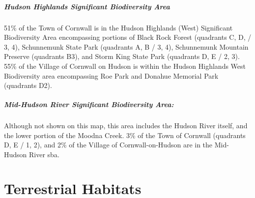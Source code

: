 \paragraph{\textit{Hudson Highlands Significant Biodiversity Area}}51\% of the 
Town of Cornwall is in the Hudson Highlands (West) Significant Biodiversity 
Area encompassing portions of Black Rock Forest (quadrants C, D, / 3, 4), 
Schunnemunk State Park (quadrants A, B / 3, 4), Schunnemunk Mountain Preserve 
(quadrants B3), and Storm King State Park (quadrants D, E / 2, 3). 55\% of the 
Village of Cornwall on Hudson is within the Hudson Highlands West Biodiversity 
area encompassing Roe Park and Donahue Memorial Park (quadrants D2). 

\paragraph{\textit{Mid-Hudson River Significant Biodiversity Area:}} Although not 
shown on this map, this area includes the Hudson River itself, and the lower 
portion of the Moodna Creek. 3\% of the Town of Cornwall (quadrants D, E / 1, 
2), and 2\% of the Village of Cornwall-on-Hudson are in the Mid-Hudson River 
\gls{sba}.

\label{map:aok}
\chapter{Terrestrial Habitats}\label{subsec:terrestrialhabitats}
